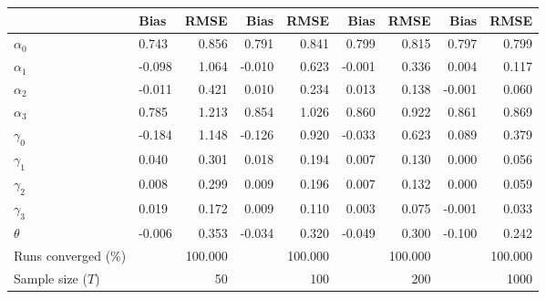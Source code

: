 
\begin{tabular}[t]{llrrrrrrr}
\toprule
  & Bias & RMSE & Bias & RMSE & Bias & RMSE & Bias & RMSE\\
\midrule
$\alpha_{0}$ & 0.743 & 0.856 & 0.791 & 0.841 & 0.799 & 0.815 & 0.797 & 0.799\\
$\alpha_{1}$ & -0.098 & 1.064 & -0.010 & 0.623 & -0.001 & 0.336 & 0.004 & 0.117\\
$\alpha_{2}$ & -0.011 & 0.421 & 0.010 & 0.234 & 0.013 & 0.138 & -0.001 & 0.060\\
$\alpha_{3}$ & 0.785 & 1.213 & 0.854 & 1.026 & 0.860 & 0.922 & 0.861 & 0.869\\
$\gamma_{0}$ & -0.184 & 1.148 & -0.126 & 0.920 & -0.033 & 0.623 & 0.089 & 0.379\\
$\gamma_{1}$ & 0.040 & 0.301 & 0.018 & 0.194 & 0.007 & 0.130 & 0.000 & 0.056\\
$\gamma_{2}$ & 0.008 & 0.299 & 0.009 & 0.196 & 0.007 & 0.132 & 0.000 & 0.059\\
$\gamma_{3}$ & 0.019 & 0.172 & 0.009 & 0.110 & 0.003 & 0.075 & -0.001 & 0.033\\
$\theta$ & -0.006 & 0.353 & -0.034 & 0.320 & -0.049 & 0.300 & -0.100 & 0.242\\
Runs converged (\%) &  & 100.000 &  & 100.000 &  & 100.000 &  & 100.000\\
Sample size ($T$) &  & 50 &  & 100 &  & 200 &  & 1000\\
\bottomrule
\end{tabular}

